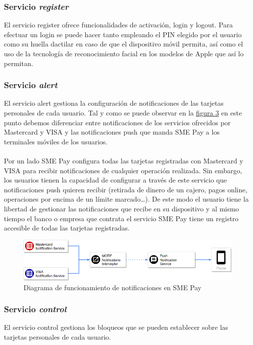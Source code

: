 \documentclass[a4paper, 12pt]{article}
\begin{document}
\subsubsection{Servicio \emph{register}}
\label{sec-3-1-1}
El servicio register ofrece funcionalidades de activación, login y logout. Para efectuar un login se puede hacer tanto empleando el PIN elegido por el usuario como su huella dactilar en caso de que el
dispositivo móvil permita, así como el uso de la tecnología de reconocimiento facial en los modelos de Apple que así lo permitan.
\subsubsection{Servicio \emph{alert}}
\label{sec-3-1-2}
El servicio alert gestiona la configuración de notificaciones de las tarjetas personales de cada usuario. Tal y como se puede observar en la \hyperref[fig:trx-alert]{figura 3}
en este punto debemos diferenciar entre notificaciones de los servicios ofrecidos por Mastercard y VISA y las notificaciones push que manda SME Pay a
los terminales móviles de los usuarios.
\\
\\
Por un lado SME Pay configura todas las tarjetas registradas con Mastercard y VISA para recibir notificaciones de cualquier operación realizada. Sin embargo,
los usuarios tienen la capacidad de configurar a través de este servicio que notificaciones push quieren recibir (retirada de dinero de un cajero, pagos online,
operaciones por encima de un límite marcado\ldots{}). De este modo el usuario tiene la libertad de gestionar las notificaciones que recibe en su dispositivo y al mismo
tiempo el banco o empresa que contrata el servicio SME Pay tiene un registro accesible de todas las tarjetas registradas.
\begin{figure}[htb]
\centering
\includegraphics[width=.9\linewidth]{./images/Trx-notification.png}
\caption{\label{fig:trx-alert}Diagrama de funcionamiento de notificaciones en SME Pay}
\end{figure}
\subsubsection{Servicio \emph{control}}
\label{sec-3-1-3}
El servicio control gestiona los bloqueos que se pueden establecer sobre las tarjetas personales de cada usuario.
\end{document}
